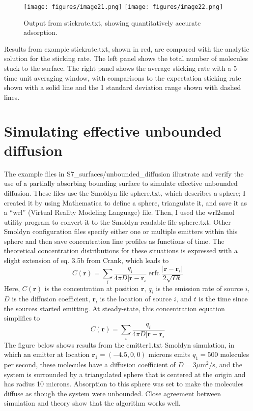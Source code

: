 \documentclass {scrbook}
\DeclareMathOperator{\erfc}{erfc}
\begin{document}
\begin{figure}[h]
\centering
\texttt{[image: figures/image21.png]}
\texttt{[image: figures/image22.png]}
\caption{Output from stickrate.txt, showing quantitatively accurate adsorption.}
\label{fig:stickrate}
\end{figure}

Results from example stickrate.txt, shown in red, are compared with the analytic solution for the sticking rate. The left panel shows the total number of molecules stuck to the surface. The right panel shows the average sticking rate with a 5 time unit averaging window, with comparisons to the expectation sticking rate shown with a solid line and the 1 standard deviation range shown with dashed lines.

\section{Simulating effective unbounded diffusion}

The example files in S7\_surfaces/unbounded\_diffusion illustrate and verify the use of a partially absorbing bounding surface to simulate effective unbounded diffusion. These files use the Smoldyn file sphere.txt, which describes a sphere; I created it by using Mathematica to define a sphere, triangulate it, and save it as a ``wrl'' (Virtual Reality Modeling Language) file. Then, I used the wrl2smol utility program to convert it to the Smoldyn-readable file sphere.txt. Other Smoldyn configuration files specify either one or multiple emitters within this sphere and then save concentration line profiles as functions of time. The theoretical concentration distributions for these situations is expressed with a slight extension of eq. 3.5b from Crank, which leads to
$$C(\mathbf{r}) = \sum_i \frac{q_i}{4 \pi D |\mathbf{r} - \mathbf{r}_i} \erfc \frac{|\mathbf{r}-\mathbf{r}_i |}{2 \sqrt{Dt}}$$
Here, $C(\mathbf{r})$ is the concentration at position $\mathbf{r}$, $q_i$ is the emission rate of source $i$, $D$ is the diffusion coefficient, $\mathbf{r}_i$ is the location of source $i$, and $t$ is the time since the sources started emitting. At steady-state, this concentration equation simplifies to
$$C(\mathbf{r}) = \sum_i \frac{q_i}{4 \pi D |\mathbf{r} - \mathbf{r}_i} $$
The figure below shows results from the emitter1.txt Smoldyn simulation, in which an emitter at location $\mathbf{r}_1 = (-4.5,0,0)$ microns emits $q_1 = 500$ molecules per second, these molecules have a diffusion coefficient of $D = 3 \mu \textrm{m}^2/\textrm{s}$, and the system is surrounded by a triangulated sphere that is centered at the origin and has radius 10 microns. Absorption to this sphere was set to make the molecules diffuse as though the system were unbounded. Close agreement between simulation and theory show that the algorithm works well.
\end{document}
